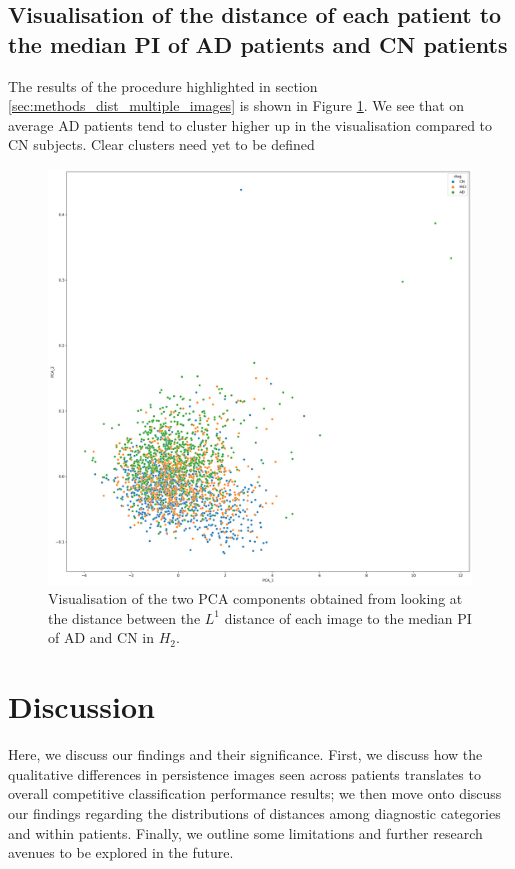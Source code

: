 \documentclass{article}
\begin{document}
\subsection{Visualisation of the distance of each patient to the median PI of AD patients and CN patients}

The results of the procedure highlighted in section \ref{sec:methods_dist_multiple_images} is shown in Figure \ref{fig:vis_pca_ad_cn}. We see that on average AD patients tend to cluster higher up in the visualisation compared to CN subjects. Clear clusters need yet to be defined

\begin{figure}
  \centering
  \includegraphics[width=\textwidth]{figures/cluster_CN_H_2_AD_H_2_PCA.png}
  \caption{Visualisation of the two PCA components obtained from looking at the distance between the $L^1$ distance of each image to the median PI of AD and CN in $H_2$.}
  \label{fig:vis_pca_ad_cn}
\end{figure}

\section{Discussion}\label{sec:discussion}

Here, we discuss our findings and their significance. First, we discuss how the qualitative differences in persistence images seen across patients translates to overall competitive classification performance results; we then move onto discuss our findings regarding the distributions of distances among diagnostic categories and within patients. Finally, we outline some limitations and further research avenues to be explored in the future.
\end{document}
